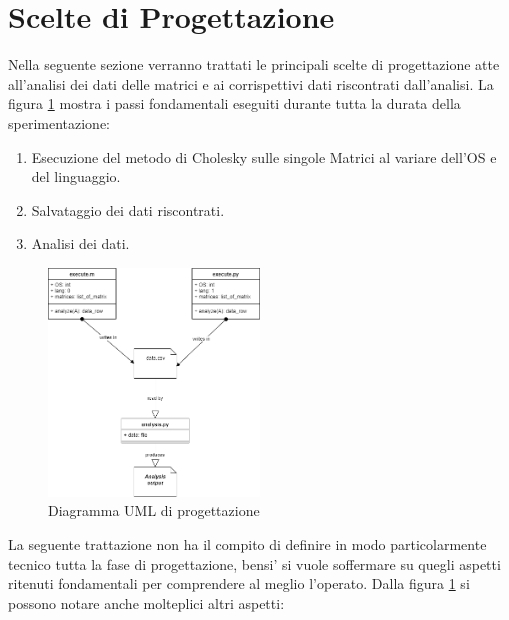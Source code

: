 \section{Scelte di Progettazione} %
Nella seguente sezione verranno trattati le principali scelte di progettazione atte all'analisi dei dati delle matrici e ai corrispettivi dati riscontrati dall'analisi. La figura \ref{fig:Progettazione} mostra i passi fondamentali eseguiti durante tutta la durata della sperimentazione:
\begin{enumerate}
    \item Esecuzione del metodo di Cholesky sulle singole Matrici al variare dell'OS e del linguaggio.
    \item Salvataggio dei dati riscontrati.
    \item Analisi dei dati.
\end{enumerate}
\begin{figure}[h!]
    \centering
    \includegraphics[width=0.5\textwidth]{figs/Structure Flowchart.png}
    \caption{Diagramma UML di progettazione}
    \label{fig:Progettazione}
\end{figure}
La seguente trattazione non ha il compito di definire in modo particolarmente tecnico tutta la fase di progettazione, bensi' si vuole soffermare su quegli aspetti ritenuti fondamentali per comprendere al meglio l'operato. Dalla figura \ref{fig:Progettazione} si possono notare anche molteplici altri aspetti:
